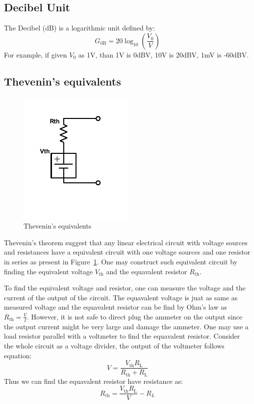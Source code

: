 \documentclass[aps,prl,reprint]{revtex4-1}
\begin{document}
    \subsection{Decibel Unit}
    The Decibel (dB) is a logarithmic unit defined by:
    \[
    G_\text{dB} = 20 \log_{10}(\frac{V_0}{V})
    \]
    For example, if given $V_0$ as 1V, than 1V is 0dBV, 10V is 20dBV, 1mV is -60dBV.
    \subsection{Thevenin's equivalents}
        \begin{figure}[h]
        \centering
        \includegraphics{images/plot5.pdf}
        \caption{Thevenin's equivalents}
        \label{fig:5}
    \end{figure}
    Thevenin's theorem suggest that any linear electrical circuit with voltage sources and resistances have a equivalent circuit with one voltage sources and one resistor in series as present in Figure~\ref{fig:5}. One may construct such equivalent circuit by finding the equivalent voltage $V_\text{th}$ and the equavalent resistor $R_\text{th}$.

    To find the equivalent voltage and resistor, one can measure the voltage and the current of the output of the circuit. The equavalent voltage is juat as same as measured voltage and the equavalent resistor can be find by Ohm's law as $R_\text{th} = \frac{V}{I}$. However, it is not safe to direct plug the ammeter on the output since the output current might be very large and damage the ammeter. One may use a load resistor parallel with a voltmeter to find the equavalent resistor. Consider the whole circuit as a voltage divider, the output of the voltmeter follows equation:
    \[
    V = \frac{V_\text{th} R_\text{L}}{R_\text{th} + R_\text{L}}
    \]
    Thus we can find the equavalent resistor have resistance as:
    \[
    R_\text{th} = \frac{V_\text{th}R_\text{L}}{V} - R_L
    \]
\end{document}
